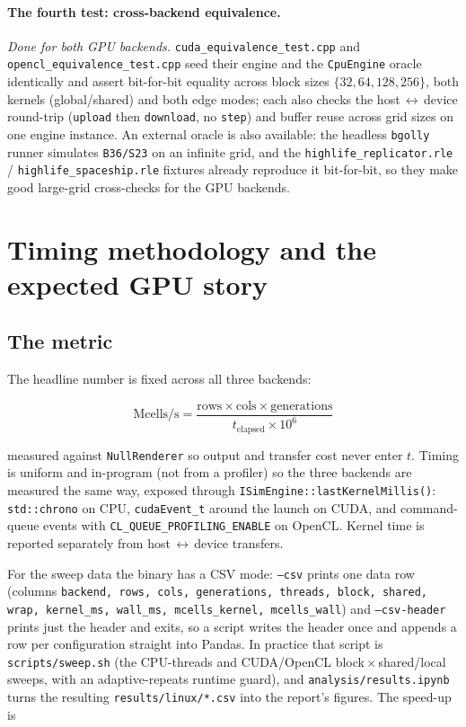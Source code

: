 \documentclass[
	english,
	letterpaper, oneside
]{article}
\begin{document}
\paragraph{The fourth test: cross-backend equivalence.} \emph{Done for both GPU
backends.} \texttt{cuda\_equivalence\_test.cpp} and
\texttt{opencl\_equivalence\_test.cpp} seed their engine and the
\texttt{CpuEngine} oracle identically and assert bit-for-bit equality across block
sizes $\{32,64,128,256\}$, both kernels (global/shared) and both edge modes; each
also checks the host\,$\leftrightarrow$\,device round-trip (\texttt{upload} then
\texttt{download}, no \texttt{step}) and buffer reuse across grid sizes on one
engine instance. An
external oracle is also available: the headless \texttt{bgolly} runner simulates
\texttt{B36/S23} on an infinite grid, and the \texttt{highlife\_replicator.rle} /
\texttt{highlife\_spaceship.rle} fixtures already reproduce it bit-for-bit, so
they make good large-grid cross-checks for the GPU backends.

\section{Timing methodology and the expected GPU story}
\label{sec:timing}

\subsection{The metric}
\label{sec:metric}

The headline number is fixed across all three backends:

\begin{equation}
	\text{Mcells/s} =
	\frac{\text{rows}\times\text{cols}\times\text{generations}}
	     {t_{\text{elapsed}}\times 10^{6}}
\end{equation}

measured against \texttt{NullRenderer} so output and transfer cost never enter
$t$. Timing is uniform and in-program (not from a profiler) so the three backends
are measured the same way, exposed through
\texttt{ISimEngine::lastKernelMillis()}: \texttt{std::chrono} on CPU,
\texttt{cudaEvent\_t} around the launch on CUDA, and command-queue events with
\texttt{CL\_QUEUE\_PROFILING\_ENABLE} on OpenCL. Kernel time is reported
separately from host\,$\leftrightarrow$\,device transfers.

For the sweep data the binary has a CSV mode: \texttt{--csv} prints one data row
(columns \texttt{backend, rows, cols, generations, threads, block, shared, wrap,
kernel\_ms, wall\_ms, mcells\_kernel, mcells\_wall}) and \texttt{--csv-header}
prints just the header and exits, so a script writes the header once and appends
a row per configuration straight into Pandas. In practice that script is
\texttt{scripts/sweep.sh} (the CPU-threads and CUDA/OpenCL
block\,$\times$\,shared/local sweeps, with an adaptive-repeats runtime guard), and
\texttt{analysis/results.ipynb} turns the resulting \texttt{results/linux/*.csv} into
the report's figures. The speed-up is
\end{document}
